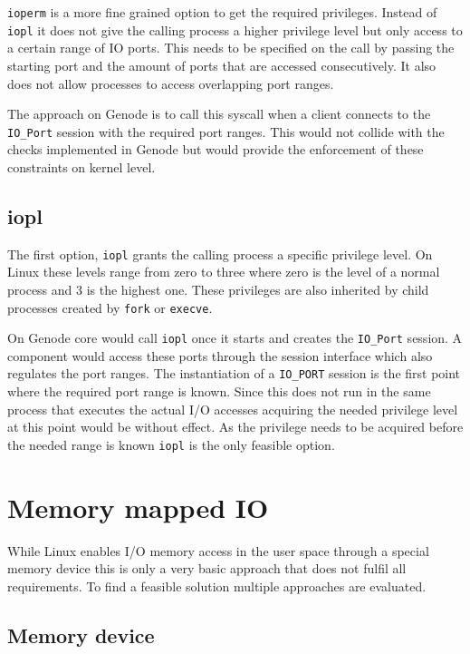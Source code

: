 \documentclass[
a4paper,
12pt,
notitlepage,
parskip=half,
DIV=11,
]{scrbook}
\begin{document}
		\texttt{ioperm} is a more fine grained option to get the required privileges.
		Instead of \texttt{iopl} it does not give the calling process a higher privilege level but only access to a certain range of IO ports.
		This needs to be specified on the call by passing the starting port and the amount of ports that are accessed consecutively.
		It also does not allow processes to access overlapping port ranges. \citep{ioperm}
		
		The approach on Genode is to call this syscall when a client connects to the \texttt{IO\_Port} session with the required port ranges.
		This would not collide with the checks implemented in Genode but would provide the enforcement of these constraints on kernel level.
				
		\subsection{iopl}
		
		The first option, \texttt{iopl} grants the calling process a specific privilege level.
		On Linux these levels range from zero to three where zero is the level of a normal process and 3 is the highest one.
		These privileges are also inherited by child processes created by \texttt{fork} or \texttt{execve}. \citep{iopl}
		
		On Genode core would call \texttt{iopl} once it starts and creates the \texttt{IO\_Port} session.
		A component would access these ports through the session interface which also regulates the port ranges.
		The instantiation of a \texttt{IO\_PORT} session is the first point where the required port range is known.
		Since this does not run in the same process that executes the actual I/O accesses acquiring the needed privilege level at this point would be without effect.
		As the privilege needs to be acquired before the needed range is known \texttt{iopl} is the only feasible option.
		
		\section{Memory mapped IO}
		
		While Linux enables I/O memory access in the user space through a special memory device this is only a very basic approach that does not fulfil all requirements.
		To find a feasible solution multiple approaches are evaluated.
		
		\subsection{Memory device}
		
\end{document}

